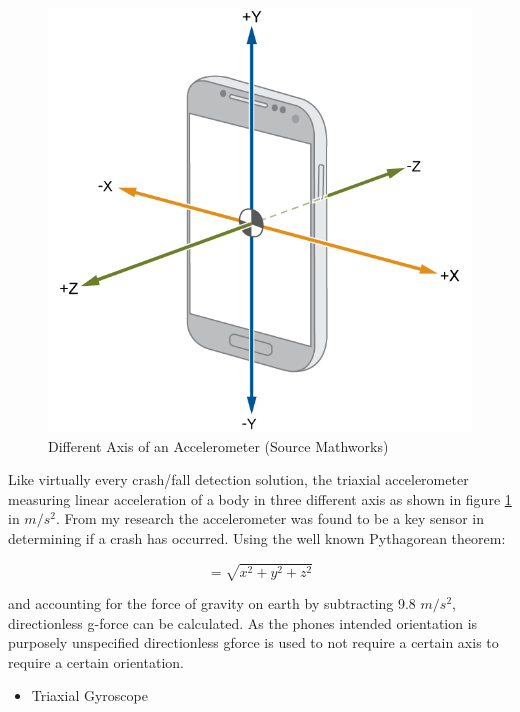 \begin{figure}
\begin{center}
\includegraphics[scale = .2] {design/a.png}
\end{center}
\caption{Different Axis of an Accelerometer (Source Mathworks)}
\label{accel}
\end{figure}

Like virtually every crash/fall detection solution, the triaxial accelerometer measuring linear acceleration of a body in three different axis as shown in figure \ref{accel} in \(m/s^2\). From my research the accelerometer was found to be a key sensor in determining if a crash has occurred. Using the well known Pythagorean theorem:  

\[
\mathit{} = 
\sqrt{x^2 + y^2 + z^2}
\]


  and accounting for the force of gravity on earth by subtracting  9.8 \(m/s^2\), directionless  g-force can be calculated. As the phones intended orientation is purposely unspecified directionless gforce is used to not require a certain axis to require a certain orientation.

\vspace{1cm}

\begin{itemize}
\item Triaxial Gyroscope
\end{itemize}


